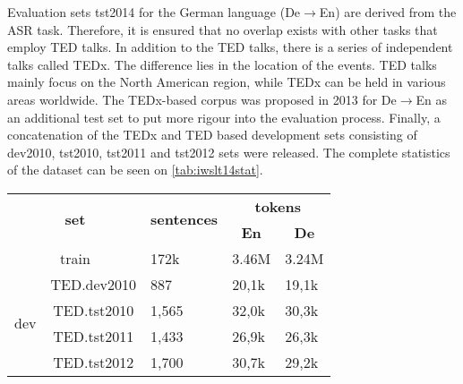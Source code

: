 Evaluation sets tst2014 for the German language (De$\rightarrow$En) are derived from the ASR task. Therefore, it is ensured that no overlap exists with other tasks that employ TED talks. In addition to the TED talks, there is a series of independent talks called TEDx. The difference lies in the location of the events. TED talks mainly focus on the North American region, while TEDx can be held in various areas worldwide. The TEDx-based corpus was proposed in 2013 for De$\rightarrow$En as an additional test set to put more rigour into the evaluation process. Finally, a concatenation of the TEDx and TED based development sets consisting of dev2010, tst2010, tst2011 and tst2012 sets were released. The complete statistics of the dataset can be seen on \cref{tab:iwslt14stat}.

\begin{table}[h]
    \centering
    \begin{tabular}{@{}cclll@{}}
        \toprule
        \multicolumn{2}{c}{\multirow{2}{*}{\textbf{set}}} & \multicolumn{1}{c}{\multirow{2}{*}{\textbf{sentences}}} & \multicolumn{2}{c}{\textbf{tokens}}                                           \\ %
        \multicolumn{2}{c}{}                              & \multicolumn{1}{c}{}                                    & \multicolumn{1}{c}{\textbf{En}}     & \multicolumn{1}{c}{\textbf{De}}         \\ \toprule
        \multicolumn{2}{c}{train}                         & 172k                                                    & 3.46M                               & 3.24M                                   \\ \midrule
        \multirow{4}{*}{dev}                              & TED.dev2010                                             & 887                                 & 20,1k                           & 19,1k \\
                                                          & TED.tst2010                                             & 1,565                               & 32,0k                           & 30,3k \\
                                                          & TED.tst2011                                             & 1,433                               & 26,9k                           & 26,3k \\
                                                          & TED.tst2012                                             & 1,700                               & 30,7k                           & 29,2k \\ \midrule

\end{tabular}
\end{table}
